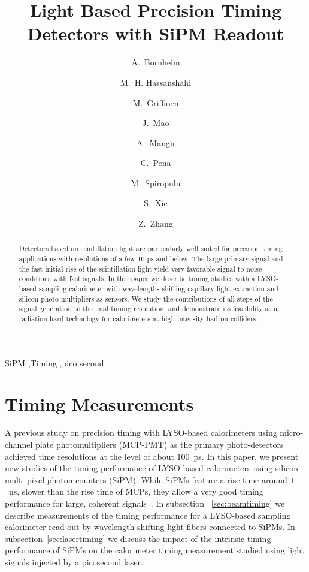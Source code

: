 \documentclass[preprint,1p]{elsarticle}
\begin{document}
  
\linenumbers

\begin{frontmatter}

\title{Light Based Precision Timing Detectors with SiPM Readout}

\author[1]{A.~Bornheim}
\author[2]{M.~H. Hassanshahi}
\author[1]{M.~Griffioen}
\author[1]{J.~Mao}
\author[1]{A.~Mangu}
\author[1]{C.~Pena}
\author[1]{M.~Spiropulu}
\author[1]{S.~Xie }
\author[1]{Z.~Zhang}
\address[1]{California Institute of Technology, Pasadena, CA, USA}
\address[2]{Institute for Research in Fundamental Science, Tehran, Iran}


\begin{abstract}
Detectors based on scintillation light are particularly well suited for precision timing applications with 
resolutions of a few 10 ps and below. The large primary signal and the fast initial rise of the scintillation
light yield very favorable signal to noise conditions with fast signals. In this paper we describe timing 
studies with a LYSO-based sampling calorimeter with wavelengths shifting capillary light extraction and silicon
photo multipliers as sensors. We study the contributions of all steps of the signal generation to 
the final timing resolution, and demonstrate its feasibility as a radiation-hard technology for calorimeters
at high intensity hadron colliders.
\end{abstract}

\begin{keyword}
SiPM \sep Timing \sep pico second
\end{keyword}

\end{frontmatter}

%
%

%
%
  
%
%
  
%
%

\section{Timing Measurements} 

A previous study on precision timing with LYSO-based calorimeters
\cite{lysotiming} using micro-channel plate photomultipliers (MCP-PMT) 
as the primary photo-detectors achieved time resolutions at the level of 
about $100$~ps. In this paper, we present new studies of the
timing performance of LYSO-based calorimeters using silicon multi-pixel 
photon counters (SiPM). While SiPMs feature a rise time around
$1$~ns, slower than the rise time of MCPs, they allow a very good timing
performance for large, coherent signals~\cite{aashrita}. In subsection
~\ref{sec:beamtiming} we describe measurements of the timing performance 
for a LYSO-based sampling calorimeter read out by wavelength shifting 
light fibers connected to SiPMs. In subsection~\ref{sec:lasertiming}
we discuss the impact of the intrinsic timing performance of SiPMs on 
the calorimeter timing measurement studied using light signals injected
by a picosecond laser.
\end{document}
